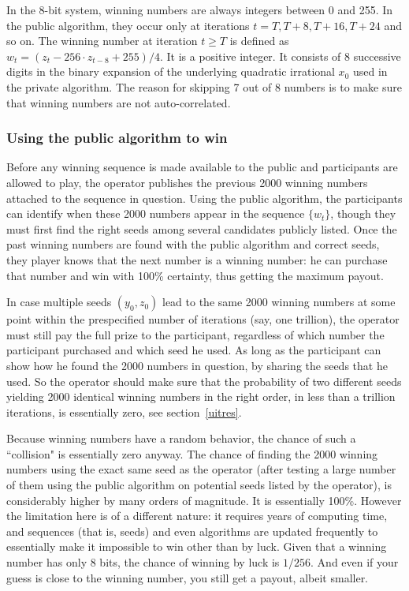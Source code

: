 \documentclass[oneside,10pt]{book}
\begin{document}
In the 8-bit system, winning numbers are always integers between 0 and 255. In the public algorithm, they occur only at iterations $t = T, T+8, T+16, T+24$ and so on.
The winning number at iteration
$t\geq T$ is defined as $w_t = (z_t - 256\cdot z_{t-8} + 255)/4$. It is a positive integer. It consists of 8 successive digits in the binary expansion of the underlying quadratic irrational $x_0$ used in the private algorithm.
The reason for skipping 7 out of 8 numbers is to make sure that winning numbers are not auto-correlated.

\subsubsection{Using the public algorithm to win}

Before any winning sequence is made available to the public and participants are allowed to play, the operator publishes the previous 2000 winning numbers  attached to the sequence in question. Using the public algorithm, the participants can identify when these 2000 numbers appear in the sequence $\{w_t\}$, though they must first find the right seeds among several candidates publicly listed. Once the past winning numbers are found with the public algorithm and correct seeds, they player knows that the next number is a winning number: he can purchase that number and win with 100\% certainty, thus getting the maximum payout.

In case multiple seeds $(y_0, z_0)$ lead to the same 2000 winning numbers at some point within the prespecified number of iterations (say, one trillion), the operator must still pay the full prize to the participant, regardless of which number the participant purchased and which seed he used.  As long as the participant can show how he found the 2000 numbers in question, by sharing the seeds that he used. So the operator should make sure that
 the probability of two different seeds yielding 2000 identical winning numbers in the right order, in less than a trillion iterations, is essentially zero, see section~\ref{uitres}.

Because winning numbers have a random behavior, the chance of such a ``collision" is essentially zero anyway. The chance of finding the 2000 winning numbers using the exact same seed as the operator (after testing a large number of them using the public algorithm on potential seeds listed by the operator),  is considerably higher by many orders of magnitude. It is
 essentially 100\%. However the limitation here is of a different nature: it requires years of computing time, and sequences (that is, seeds) and even algorithms are updated frequently to essentially make it impossible to win other than by luck. Given that a winning number has only 8 bits, the chance of winning by luck is $1/256$.  And even if your guess is close to the winning number, you still get a payout, albeit smaller.
\end{document}
